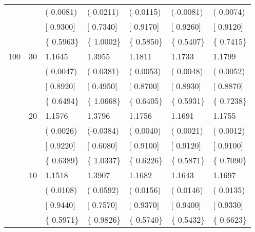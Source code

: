 \begin{table}[ht]
\begin{tabular}{lllllll}
   &  & (-0.0081) & (-0.0211) & (-0.0115) & (-0.0081) & (-0.0074) \\ 
   &  & [ 0.9300] & [ 0.7340] & [ 0.9170] & [ 0.9260] & [ 0.9120] \\ 
   &  & \{ 0.5963\} & \{ 1.0002\} & \{ 0.5850\} & \{ 0.5407\} & \{ 0.7415\} \\ 
  100 & 30 &  1.1645 &  1.3955 &  1.1811 &  1.1733 &  1.1799 \\ 
   &  & ( 0.0047) & ( 0.0381) & ( 0.0053) & ( 0.0048) & ( 0.0052) \\ 
   &  & [ 0.8920] & [ 0.4950] & [ 0.8700] & [ 0.8930] & [ 0.8870] \\ 
   &  & \{ 0.6494\} & \{ 1.0668\} & \{ 0.6405\} & \{ 0.5931\} & \{ 0.7238\} \\ 
   & 20 &  1.1576 &  1.3796 &  1.1756 &  1.1691 &  1.1755 \\ 
   &  & ( 0.0026) & (-0.0384) & ( 0.0040) & ( 0.0021) & ( 0.0012) \\ 
   &  & [ 0.9220] & [ 0.6080] & [ 0.9100] & [ 0.9120] & [ 0.9100] \\ 
   &  & \{ 0.6389\} & \{ 1.0337\} & \{ 0.6226\} & \{ 0.5871\} & \{ 0.7090\} \\ 
   & 10 &  1.1518 &  1.3907 &  1.1682 &  1.1643 &  1.1697 \\ 
   &  & ( 0.0108) & ( 0.0592) & ( 0.0156) & ( 0.0146) & ( 0.0135) \\ 
   &  & [ 0.9440] & [ 0.7570] & [ 0.9370] & [ 0.9400] & [ 0.9330] \\ 
   &  & \{ 0.5971\} & \{ 0.9826\} & \{ 0.5740\} & \{ 0.5432\} & \{ 0.6623\} \\ 
   \hline
\end{tabular}
\end{table}

